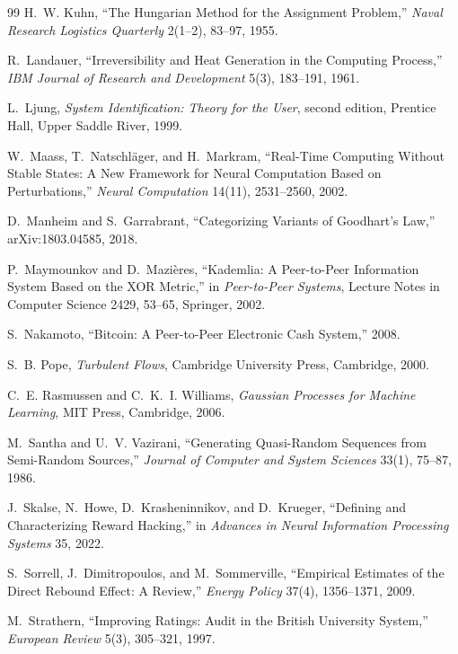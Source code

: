 \documentclass[11pt,openany]{book}
\theoremstyle{plain}
\theoremstyle{definition}
\theoremstyle{remark}
\begin{document}
\begin{thebibliography}{99}
H.~W. Kuhn,
``The Hungarian Method for the Assignment Problem,''
\emph{Naval Research Logistics Quarterly} 2(1--2), 83--97, 1955.

R.~Landauer,
``Irreversibility and Heat Generation in the Computing Process,''
\emph{IBM Journal of Research and Development} 5(3), 183--191, 1961.

L.~Ljung,
\emph{System Identification: Theory for the User},
second edition, Prentice Hall, Upper Saddle River, 1999.

W.~Maass, T.~Natschl\"ager, and H.~Markram,
``Real-Time Computing Without Stable States: A New Framework for Neural Computation Based on Perturbations,''
\emph{Neural Computation} 14(11), 2531--2560, 2002.

D.~Manheim and S.~Garrabrant,
``Categorizing Variants of Goodhart's Law,''
arXiv:1803.04585, 2018.

P.~Maymounkov and D.~Mazi\`eres,
``Kademlia: A Peer-to-Peer Information System Based on the XOR Metric,''
in \emph{Peer-to-Peer Systems}, Lecture Notes in Computer Science 2429, 53--65, Springer, 2002.

S.~Nakamoto,
``Bitcoin: A Peer-to-Peer Electronic Cash System,''
2008.

S.~B. Pope,
\emph{Turbulent Flows},
Cambridge University Press, Cambridge, 2000.

C.~E. Rasmussen and C.~K.~I. Williams,
\emph{Gaussian Processes for Machine Learning},
MIT Press, Cambridge, 2006.

M.~Santha and U.~V. Vazirani,
``Generating Quasi-Random Sequences from Semi-Random Sources,''
\emph{Journal of Computer and System Sciences} 33(1), 75--87, 1986.

J.~Skalse, N.~Howe, D.~Krasheninnikov, and D.~Krueger,
``Defining and Characterizing Reward Hacking,''
in \emph{Advances in Neural Information Processing Systems} 35, 2022.

S.~Sorrell, J.~Dimitropoulos, and M.~Sommerville,
``Empirical Estimates of the Direct Rebound Effect: A Review,''
\emph{Energy Policy} 37(4), 1356--1371, 2009.

M.~Strathern,
``Improving Ratings: Audit in the British University System,''
\emph{European Review} 5(3), 305--321, 1997.


\end{thebibliography}
\end{document}
